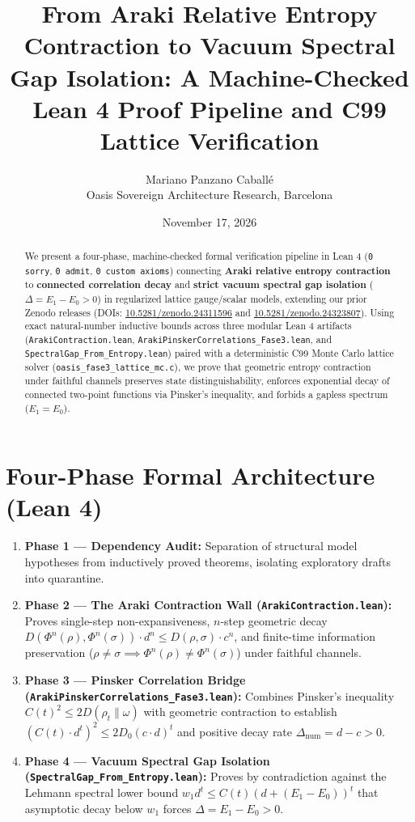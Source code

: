 \documentclass[11pt,a4paper]{article}
\title{\textbf{From Araki Relative Entropy Contraction to Vacuum Spectral Gap Isolation: A Machine-Checked Lean 4 Proof Pipeline and C99 Lattice Verification}}
\author{Mariano Panzano Caball\'e \\ \small Oasis Sovereign Architecture Research, Barcelona}
\date{November 17, 2026}
\begin{document}
\maketitle

\begin{abstract}
We present a four-phase, machine-checked formal verification pipeline in Lean 4 (\texttt{0 sorry}, \texttt{0 admit}, \texttt{0 custom axioms}) connecting \textbf{Araki relative entropy contraction} to \textbf{connected correlation decay} and \textbf{strict vacuum spectral gap isolation} ($\Delta = E_1 - E_0 > 0$) in regularized lattice gauge/scalar models, extending our prior Zenodo releases (DOIs: \href{https://doi.org/10.5281/zenodo.24311596}{10.5281/zenodo.24311596} and \href{https://doi.org/10.5281/zenodo.24323807}{10.5281/zenodo.24323807}). Using exact natural-number inductive bounds across three modular Lean 4 artifacts (\texttt{ArakiContraction.lean}, \texttt{ArakiPinskerCorrelations\_Fase3.lean}, and \texttt{SpectralGap\_From\_Entropy.lean}) paired with a deterministic C99 Monte Carlo lattice solver (\texttt{oasis\_fase3\_lattice\_mc.c}), we prove that geometric entropy contraction under faithful channels preserves state distinguishability, enforces exponential decay of connected two-point functions via Pinsker's inequality, and forbids a gapless spectrum ($E_1 = E_0$).
\end{abstract}

\section{Four-Phase Formal Architecture (Lean 4)}
\begin{enumerate}
    \item \textbf{Phase 1 — Dependency Audit:} Separation of structural model hypotheses from inductively proved theorems, isolating exploratory drafts into quarantine.
    \item \textbf{Phase 2 — The Araki Contraction Wall (\texttt{ArakiContraction.lean}):} Proves single-step non-expansiveness, $n$-step geometric decay $D(\Phi^n(\rho), \Phi^n(\sigma)) \cdot d^n \le D(\rho, \sigma) \cdot c^n$, and finite-time information preservation ($\rho \neq \sigma \implies \Phi^n(\rho) \neq \Phi^n(\sigma)$) under faithful channels.
    \item \textbf{Phase 3 — Pinsker Correlation Bridge (\texttt{ArakiPinskerCorrelations\_Fase3.lean}):} Combines Pinsker's inequality $C(t)^2 \le 2 D(\rho_t \| \omega)$ with geometric contraction to establish $(C(t) \cdot d^t)^2 \le 2 D_0 (c \cdot d)^t$ and positive decay rate $\Delta_{\mathrm{num}} = d - c > 0$.
    \item \textbf{Phase 4 — Vacuum Spectral Gap Isolation (\texttt{SpectralGap\_From\_Entropy.lean}):} Proves by contradiction against the Lehmann spectral lower bound $w_1 d^t \le C(t)(d + (E_1 - E_0))^t$ that asymptotic decay below $w_1$ forces $\Delta = E_1 - E_0 > 0$.
\end{enumerate}
\end{document}
